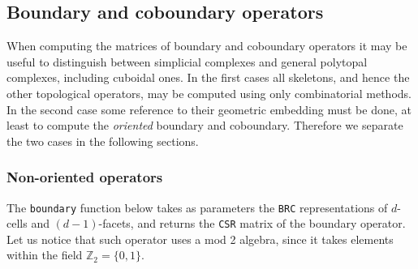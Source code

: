 \documentclass[11pt,oneside]{article}	%
\def\Z{\mathbb{Z}}
\begin{document}
\subsection{Boundary and coboundary operators}

When computing the matrices of boundary and coboundary operators it may be useful to distinguish between simplicial complexes and general polytopal complexes, including  cuboidal ones. In the first cases all skeletons, and hence the other topological operators, may be computed using only combinatorial methods. In the second case some reference to their geometric embedding must be done, at least to compute the \emph{oriented} boundary and coboundary. Therefore we separate the two cases in the following sections.


\subsubsection{Non-oriented operators}

The \texttt{boundary} function below takes as parameters the \texttt{BRC} representations of $d$-cells and $(d-1)$-facets, and returns the \texttt{CSR} matrix of the boundary operator. Let us notice that such operator uses a mod 2 algebra, since it takes elements within the field $\Z_2=\{0,1\}$.
\end{document}
